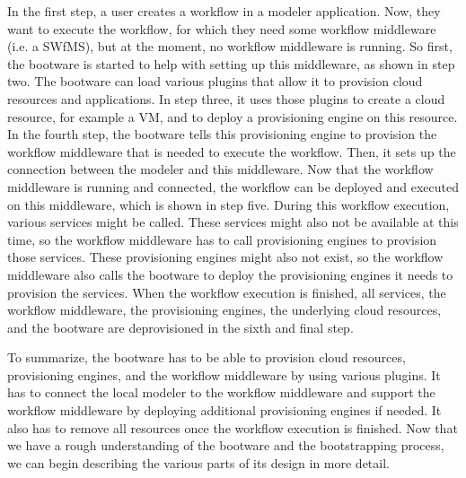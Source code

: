 In the first step, a user creates a workflow in a modeler application.
Now, they want to execute the workflow, for which they need some workflow middleware (i.e. a SWfMS), but at the moment, no workflow middleware is running.
So first, the bootware is started to help with setting up this middleware, as shown in step two.
The bootware can load various plugins that allow it to provision cloud resources and applications.
In step three, it uses those plugins to create a cloud resource, for example a VM, and to deploy a provisioning engine on this resource.
In the fourth step, the bootware tells this provisioning engine to provision the workflow middleware that is needed to execute the workflow.
Then, it sets up the connection between the modeler and this middleware.
Now that the workflow middleware is running and connected, the workflow can be deployed and executed on this middleware, which is shown in step five.
During this workflow execution, various services might be called.
These services might also not be available at this time, so the workflow middleware has to call provisioning engines to provision those services.
These provisioning engines might also not exist, so the workflow middleware also calls the bootware to deploy the provisioning engines it needs to provision the services.
When the workflow execution is finished, all services, the workflow middleware, the provisioning engines, the underlying cloud resources, and the bootware are deprovisioned in the sixth and final step.

To summarize, the bootware has to be able to provision cloud resources, provisioning engines, and the workflow middleware by using various plugins.
It has to connect the local modeler to the workflow middleware and support the workflow middleware by deploying additional provisioning engines if needed.
It also has to remove all resources once the workflow execution is finished.
Now that we have a rough understanding of the bootware and the bootstrapping process, we can begin describing the various parts of its design in more detail.













